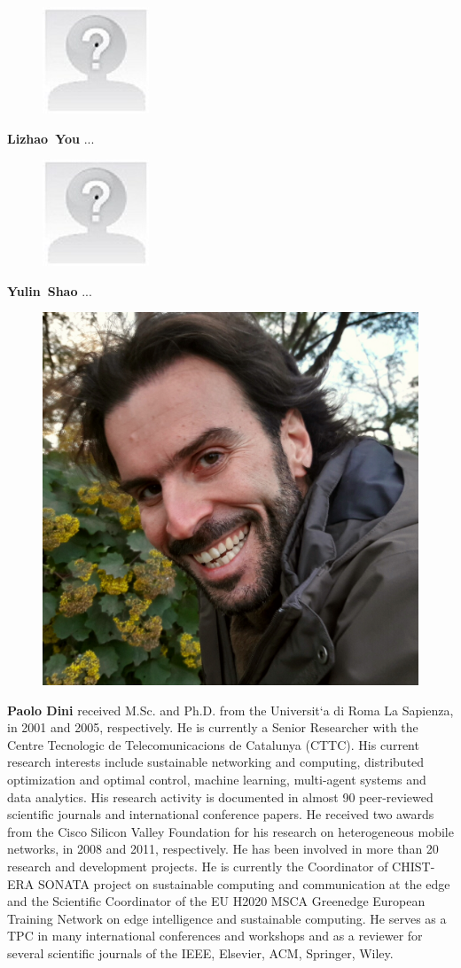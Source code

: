 \documentclass[10pt,a4paper,twocolumn]{article}
\newcommand{\ITUpar}{\vspace{8pt}\par}
\def\startfigure{\vspace{6pt}\begin{figure}[ht]\center}
\begin{document}
\startfigure\includegraphics[width=0.4\columnwidth]{img/yourphotofilename} 
\end{figure} \textbf{Lizhao~You} ...

\startfigure\includegraphics[width=0.4\columnwidth]{img/yourphotofilename} 
\end{figure} \textbf{Yulin~Shao} ...

\startfigure\includegraphics[width=0.4\columnwidth]{img/photo_paolo} 
\end{figure}\textbf{Paolo Dini} received M.Sc. and Ph.D. from the Universit`a di Roma La Sapienza, in 2001 and 2005, respectively. He is currently a Senior Researcher with the Centre Tecnologic de Telecomunicacions de Catalunya (CTTC). His current research interests include sustainable networking and computing, distributed optimization and optimal control, machine learning, multi-agent systems and data analytics. His research activity is documented in almost 90 peer-reviewed scientific journals and international conference papers. He received two awards from the Cisco Silicon Valley Foundation for his research on heterogeneous mobile networks, in 2008 and 2011, respectively. He has been involved in more than 20 research and development projects. He is currently the Coordinator of CHIST-ERA SONATA project on sustainable computing and communication at the edge and the Scientific Coordinator of the EU H2020 MSCA Greenedge European Training Network on edge intelligence and sustainable computing. He serves as a TPC in many international conferences and workshops and as a reviewer for several scientific journals of the IEEE, Elsevier, ACM, Springer, Wiley.
\ITUpar
\end{document}
